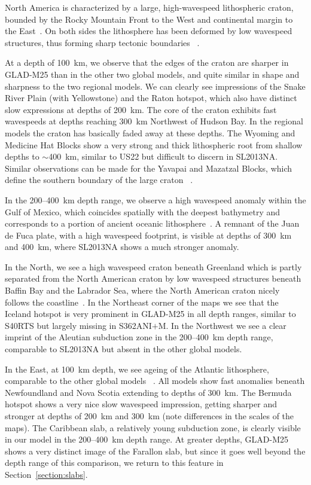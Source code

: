 North America is characterized by a large, high-wavespeed lithospheric craton,
bounded by the Rocky Mountain Front to the West and continental
margin to the East~\cite{grand1984upper, whitmeyer2007tectonic}.
On both sides the lithosphere has been deformed by
low wavespeed structures, thus forming sharp tectonic boundaries
~\cite{masters1996shear, grand1997high, megnin2000three, gu2001models}.

At a depth of 100~km, we observe that the edges of the craton are sharper in
GLAD-M25 than in the other two global models,
and quite similar in shape and sharpness to the two regional models.
We can clearly see impressions of the Snake River Plain (with Yellowstone)
and the Raton hotspot, which also have distinct slow expressions at depths of 200~km.
The core of the craton exhibits fast wavespeeds at depths reaching 300~km Northwest of
Hudson Bay.
In the regional models the craton has basically faded away at these depths.
The Wyoming and Medicine Hat Blocks show a very strong and thick lithospheric
root from shallow depths to $\sim$400~km, similar to US22 but
difficult to discern in SL2013NA.
Similar observations can be made for the Yavapai and
Mazatzal Blocks, which define the southern boundary of the large craton
~\cite{schaeffer2014imaging}.

In the 200--400~km depth range, we observe a high wavespeed
anomaly within the Gulf of Mexico, which coincides spatially with the deepest
bathymetry and corresponds to a portion of ancient oceanic
lithosphere~\cite{muller2008, schaeffer2014imaging}.
A remnant of the Juan de Fuca plate,
with a high wavespeed footprint, is visible at depths of 300~km and 400~km,
where SL2013NA shows a much stronger anomaly.

In the North, we see a high wavespeed craton beneath Greenland which is partly
separated from the North American craton by low wavespeed structures beneath
Baffin Bay and the Labrador Sea, where the North American craton nicely follows
the coastline~\cite{chalmers2001development}.
In the Northeast corner of the maps we see that the Iceland hotspot is very
prominent in GLAD-M25 in all depth ranges, similar to S40RTS but largely missing
in S362ANI$+$M. In the Northwest we see a clear imprint of the Aleutian
subduction zone in the 200--400~km depth range, comparable to SL2013NA but absent
in the other global models.

In the East, at 100~km depth,
we see ageing of the Atlantic lithosphere, comparable to the other global models
~\cite{muller2008, schaeffer2014imaging}.
All models show fast anomalies beneath Newfoundland and Nova Scotia extending to
depths of 300~km. The Bermuda hotspot shows a very nice slow wavespeed impression,
getting sharper and stronger at depths of 200~km and 300~km (note differences in
the scales of the maps).
The Caribbean slab, a relatively young subduction zone, is clearly
visible in our model in the 200--400~km depth range.
At greater depths,
GLAD-M25 shows a very distinct image of the Farallon slab,
but since it goes well beyond the depth range of this comparison,
we return to this feature in Section~\ref{section:slabs}.

